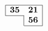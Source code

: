 \documentclass[10pt]{article}
\begin{document}
\TeXtoEPS
\setlength\arraycolsep{1pt}
\(
\begin{array}{|rr|}
\hline
\textbf{35} & \textbf{21}\\
\cline{1-1}
\multicolumn{1}{r|}{} & \multicolumn{1}{r|}{\textbf{56}}\\
\cline{2-2}
\end{array}
\)
\endTeXtoEPS
\end{document}
